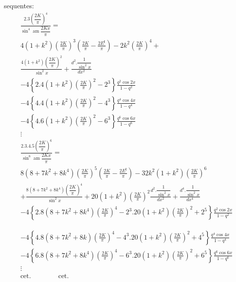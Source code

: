 \documentclass{article}
\begin{document}
sequentes:
\[
\begin{gathered}
\frac{2.3\left(\dfrac{2K}{\pi}\right)^{4}}{\sin^{4}\operatorname{am}\dfrac{2Kx}{\pi}}=\\[1.5ex]
4(1+k^{2})\left(\frac{2K}{\pi}\right)^{3}\left(\frac{2K}{\pi}-\frac{2E^{\mathrm{I}}}{\pi}\right)-2k^{2}\left(\frac{2K}{\pi}\right)^{4}+\\[1.5ex]
\frac{4(1+k^{2})\left(\dfrac{2K}{\pi}\right)^{2}}{\sin^{2}x}+\frac{d^{2}.\dfrac{1}{\sin^{2}x}}{dx^{2}}\\[1.5ex]
-4\left\{2.4(1+k^{2})\left(\frac{2K}{\pi}\right)^{2}-2^{3}\right\}\frac{q^{2}\cos 2x}{1-q^{2}}\\[1.5ex]
-4\left\{4.4(1+k^{2})\left(\frac{2K}{\pi}\right)^{2}-4^{3}\right\}\frac{q^{4}\cos 4x}{1-q^{4}}\\[1.5ex]
-4\left\{4.6(1+k^{2})\left(\frac{2K}{\pi}\right)^{2}-6^{3}\right\}\frac{q^{6}\cos 6x}{1-q^{6}}\\[1.5ex]
\vdots\\[1.5ex]
\frac{2.3.4.5\left(\dfrac{2K}{\pi}\right)^{6}}{\sin^{6}\operatorname{am}\dfrac{2Kx}{\pi}}=\\[1.5ex]
8(8+7k^{2}+8k^{4})\left(\frac{2K}{\pi}\right)^{5}\left(\frac{2K}{\pi}-\frac{2E^{\mathrm{I}}}{\pi}\right)-32k^{2}(1+k^{2})\left(\frac{2K}{\pi}\right)^{6}\\[1.5ex]
+\frac{8(8+7k^{2}+8k^{4})\left(\dfrac{2K}{\pi}\right)^{4}}{\sin^{2}x}+20(1+k^{2})\left(\frac{2K}{\pi}\right)^{2}\frac{d^{2}.\dfrac{1}{\sin^{2}x}}{dx^{2}}+\frac{d^{4}.\dfrac{1}{\sin^{2}x}}{dx^{4}}\\[1.5ex]
-4\left\{2.8(8+7k^{2}+8k^{4})\left(\frac{2K}{\pi}\right)^{4}-2^{3}.20(1+k^{2})\left(\frac{2K}{\pi}\right)^{2}+2^{5}\right\}\frac{q^{2}\cos 2x}{1-q^{2}}
\end{gathered}
\]

\[
\begin{gathered}
-4\left\{4.8(8+7k^{2}+8k)\left(\frac{2K}{\pi}\right)^{4}-4^{3}.20(1+k^{2})\left(\frac{2K}{\pi}\right)^{2}+4^{5}\right\}\frac{q^{4}\cos 4x}{1-q^{4}}\\[1.5ex]
-4\left\{6.8(8+7k^{2}+8k^{4})\left(\frac{2K}{\pi}\right)^{4}-6^{3}.20(1+k^{2})\left(\frac{2K}{\pi}\right)^{2}+6^{5}\right\}\frac{q^{6}\cos 6x}{1-q^{6}}\\[1.5ex]
\vdots\\[1.5ex]
\text{cet.}\qquad\qquad\text{cet.}
\end{gathered}
\]
\end{document}
